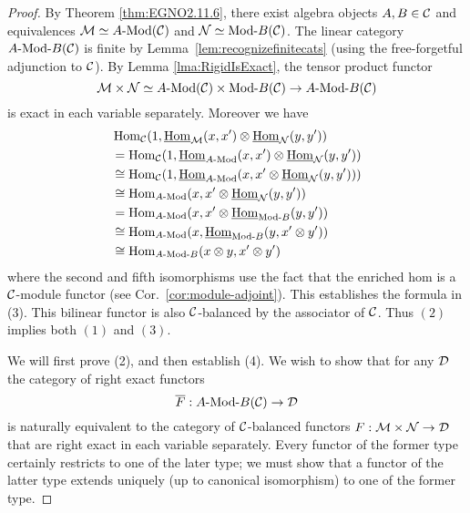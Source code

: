 \documentclass{amsart}
\begin{document}
\begin{proof}  
	 By Theorem \ref{thm:EGNO2.11.6}, there exist algebra objects $A, B \in \mathcal C$ and equivalences $\cM \simeq \Mod{A}{}(\cC)$ and $\cN \simeq \Mod{}{B}(\cC)$. The linear category $\Mod{A }{B}(\cC)$ is finite by Lemma~\ref{lem:recognizefinitecats} (using the free-forgetful adjunction to $\mathcal C$).
	 By Lemma \ref{lma:RigidIsExact}, the tensor product functor
	\begin{equation*}
		\cM \times \cN \simeq \Mod{A}{}(\cC) \times  \Mod{}{B}(\cC) \to \Mod{A}{B}(\cC)
	\end{equation*}
	is exact in each variable separately. Moreover we have
	\begin{align*}
		&\Hom_{\cC}(1, \IHom_{\cM}(x,x') \otimes \IHom_{\cN}(y, y')) \\
		& = \Hom_{\cC}(1, \IHom_{\Mod{A}{}}(x,x') \otimes \IHom_{\cN}(y, y')) \\
		&\cong \Hom_{\cC}(1, \IHom_{\Mod{A}{}}(x,x' \otimes \IHom_{\cN}(y, y')) ) \\
		& \cong \Hom_{\Mod{A}{}}(x, x' \otimes \IHom_{\cN}(y, y') ) \\
		& = \Hom_{\Mod{A}{}}(x, x' \otimes \IHom_{\Mod{}{B}}(y, y') )\\
		& \cong \Hom_{\Mod{A}{}}(x,  \IHom_{\Mod{}{B}}(y, x' \otimes y') )\\
		& \cong \Hom_{\Mod{A}{B}}(x \otimes y, x' \otimes y')
	\end{align*} 
where the second and fifth isomorphisms use the fact that the enriched hom is a $\mathcal C$-module functor (see Cor.~\ref{cor:module-adjoint}). This establishes the formula in (3). This bilinear functor is also $\mathcal C$-balanced by the associator of $\mathcal C$.  Thus $(2)$ implies both  $(1)$ and $(3)$. 

	We will first prove (2), and then establish (4).  We wish to show that for any $\mathcal D$ the category of right exact functors 
\begin{equation*}
	\overline{F}:\Mod{A}{B}(\cC) \to \cD
\end{equation*}
	is naturally equivalent to the category of $\mathcal C$-balanced functors $F:\mathcal M \times \mathcal N \to \mathcal D$ that are right exact in each variable separately. Every functor of the former type certainly restricts to one of the later type; we must show that a functor of the latter type extends uniquely (up to canonical isomorphism) to one of the former type. 
	

\end{proof}
\end{document}
